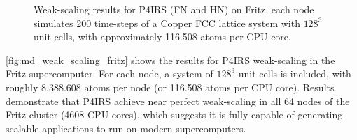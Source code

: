 \documentclass[preprint,12pt]{elsarticle}
\begin{document}
\begin{figure}[t]
\centering
{}
\vspace{-3ex}
\caption{Weak-scaling results for P4IRS (FN and HN) on Fritz, each node simulates 200 time-steps of a Copper FCC lattice system with $128^3$ unit cells, with approximately 116.508 atoms per CPU core.}
\vspace{-2ex}
\label{fig:md_weak_scaling_fritz}
\end{figure}

\autoref{fig:md_weak_scaling_fritz} shows the results for P4IRS weak-scaling in the Fritz supercomputer.
For each node, a system of $128^3$ unit cells is included, with roughly 8.388.608 atoms per node (or 116.508 atoms per CPU core).
Results demonstrate that P4IRS achieve near perfect weak-scaling in all 64 nodes of the Fritz cluster (4608 CPU cores), which suggests it is fully capable of generating scalable applications to run on modern supercomputers.
\end{document}
